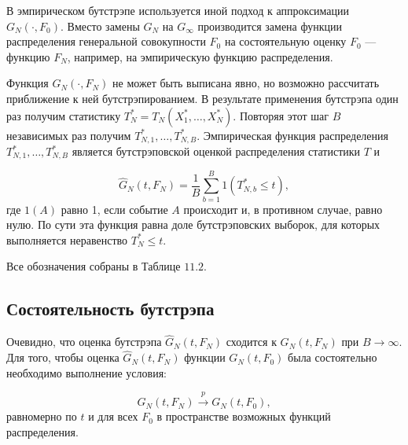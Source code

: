 В эмпирическом бутстрэпе используется иной подход к аппроксимации $G_N(\cdot,F_0)$. Вместо замены $G_N$ на $G_{\infty}$ производится замена функции распределения генеральной совокупности $F_0$ на состоятельную оценку $F_0$ --- функцию $F_N$, например, на  эмпирическую функцию  распределения.

Функция $G_N(\cdot,F_N)$ не может быть выписана явно, но возможно рассчитать приближение к ней бутстрэпированием. В результате применения бутстрэпа один раз получим статистику $T_N^*=T_N(X_1^*,\ldots ,X_N^*)$. Повторяя этот шаг $B$ независимых раз получим $T_{N,1}^*,\ldots ,T_{N,B}^*$. Эмпирическая функция распределения $T_{N,1}^*,\ldots ,T_{N,B}^*$ является бутстрэповской оценкой распределения статистики $T$ и

\begin{equation}
\hat{G}_N(t,F_N)=\dfrac{1}{B}\sum_{b=1}^{B}1(T_{N,b}^* \leq t),
\end{equation}
где $1(A)$ равно 1, если событие $A$ происходит и, в противном случае, равно нулю. По сути эта функция равна доле бутстрэповских выборок, для которых выполняется неравенство $T_N^* \leq t$.

Все обозначения собраны в Таблице $11.2$.


\subsection{Состоятельность бутстрэпа}

Очевидно, что оценка бутстрэпа $\hat{G}_N(t,F_N)$ сходится к $G_N(t,F_N)$ при $B \rightarrow \infty$. Для того, чтобы оценка $\hat{G}_N(t,F_N)$ функции $G_N(t,F_0)$ была состоятельно необходимо выполнение условия:

\[
G_N(t,F_N) \stackrel{p}{\rightarrow} G_N(t,F_0),
\]
равномерно по $t$ и для всех $F_0$ в пространстве возможных функций  распределения.


